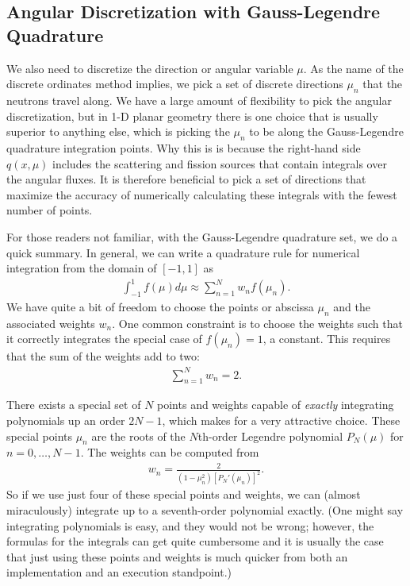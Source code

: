 \subsection{Angular Discretization with Gauss-Legendre Quadrature}

We also need to discretize the direction or angular variable $\mu$. As the name of the discrete ordinates method implies, we pick a set of discrete directions $\mu_n$ that the neutrons travel along. We have a large amount of flexibility to pick the angular discretization, but in 1-D planar geometry there is one choice that is usually superior to anything else, which is picking the $\mu_n$ to be along the Gauss-Legendre quadrature integration points. Why this is is because the right-hand side $q(x,\mu)$ includes the scattering and fission sources that contain integrals over the angular fluxes. It is therefore beneficial to pick a set of directions that maximize the accuracy of numerically calculating these integrals with the fewest number of points.

For those readers not familiar, with the Gauss-Legendre quadrature set, we do a quick summary. In general, we can write a quadrature rule for numerical integration from the domain of $[-1,1]$ as
\begin{align}
  \int_{-1}^1 f(\mu) d\mu \approx \sum_{n=1}^N w_n f(\mu_n) .
\end{align}
We have quite a bit of freedom to choose the points or abscissa $\mu_n$ and the associated weights $w_n$. One common constraint is to choose the weights such that it correctly integrates the special case of $f(\mu_n) = 1$, a constant. This requires that the sum of the weights add to two:
\begin{align}
  \sum_{n=1}^N w_n = 2.
\end{align}

There exists a special set of $N$ points and weights capable of \emph{exactly} integrating polynomials up an order $2N - 1$, which makes for a very attractive choice. These special points $\mu_n$ are the roots of the $N$th-order Legendre polynomial $P_N(\mu)$ for $n = 0,\ldots,N-1$. The weights can be computed from
\begin{align}
  w_n = \frac{ 2 }{ ( 1 - \mu_n^2 ) \left[ P_N'(\mu_n) \right]^2 } .
\end{align}
So if we use just four of these special points and weights, we can (almost miraculously) integrate up to a seventh-order polynomial exactly. (One might say integrating polynomials is easy, and they would not be wrong; however, the formulas for the integrals can get quite cumbersome and it is usually the case that just using these points and weights is much quicker from both an implementation and an execution standpoint.) 

